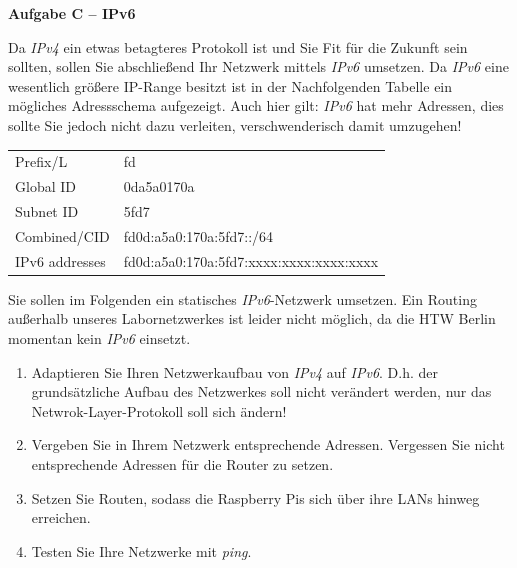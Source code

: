 \documentclass[paper=a4,fontsize=11pt]{scrartcl}%
\numberwithin{equation}{section}
\begin{document}
\begin{center}\Large{\textbf{Aufgabe C -- IPv6}}\end{center}\vskip0.25in
Da \emph{IPv4} ein etwas betagteres Protokoll ist und Sie Fit für die Zukunft sein sollten, sollen Sie abschließend Ihr Netzwerk mittels \emph{IPv6} umsetzen. Da \emph{IPv6} eine wesentlich größere IP-Range besitzt ist in der Nachfolgenden Tabelle ein mögliches Adressschema aufgezeigt. Auch hier gilt: \emph{IPv6} hat mehr Adressen, dies sollte Sie jedoch nicht dazu verleiten, verschwenderisch damit umzugehen!
\begin{table}[H]
\centering
\begin{tabular}{ll}
 Prefix/L & fd  \\
 Global ID & 0da5a0170a \\
 Subnet ID &  5fd7\\
 Combined/CID & fd0d:a5a0:170a:5fd7::/64 \\
 IPv6 addresses & fd0d:a5a0:170a:5fd7:xxxx:xxxx:xxxx:xxxx 
\end{tabular}
\end{table}
Sie sollen im Folgenden ein statisches \emph{IPv6}-Netzwerk umsetzen. Ein Routing außerhalb unseres Labornetzwerkes ist leider nicht möglich, da die HTW Berlin momentan kein \emph{IPv6} einsetzt.
\begin{enumerate}
	\item Adaptieren Sie Ihren Netzwerkaufbau von \emph{IPv4} auf \emph{IPv6}. D.h. der grundsätzliche Aufbau des Netzwerkes soll nicht verändert werden, nur das Netwrok-Layer-Protokoll soll sich ändern!
	\item Vergeben Sie in Ihrem Netzwerk entsprechende Adressen. Vergessen Sie nicht entsprechende Adressen für die Router zu setzen.
	\item Setzen Sie Routen, sodass die Raspberry Pis sich über ihre LANs hinweg erreichen.
	\item Testen Sie Ihre Netzwerke mit \emph{ping}.
\end{enumerate}
\end{document}
